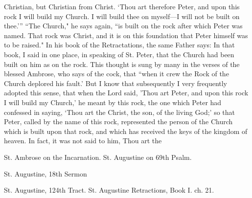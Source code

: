 Christian, but Christian from Christ. ‘Thou art therefore Peter, and upon this rock I will build my Church. I will build thee on myself—I will not be built on thee.’” “The Church," he says again, “is built on the rock after which Peter was named. That rock was Christ, and it is on this foundation that Peter himself was to be raised." In his book of the Retractations, the same Father says: In that book, I said in one place, in speaking of St. Peter, that the Church had been built on him as on the rock. This thought is sung by many in the verses of the blessed Ambrose, who says of the cock, that “when it crew the Rock of the Church deplored his fault.’ But I know that subsequently I very frequently adopted this sense, that when the Lord said, 'Thou art Peter, and upon this rock I will build my Church,' he meant by this rock, the one which Peter had confessed in saying, ‘Thou art the Christ, the son, of the living God;' so that Peter, called by the name of this rock, represented the person of the Church which is built upon that rock, and which has received the keys of the kingdom of heaven. In fact, it was not said to him, Thou art the

St. Ambrose on the Incarnation. St. Augustine on 69th Psalm.

St. Augustine, 18th Sermon

St. Augustine, 124th Tract. St. Augustine Retractions, Book I. ch. 21.

